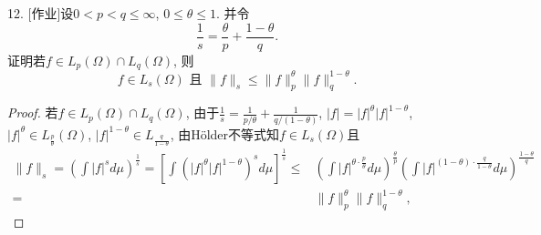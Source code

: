 \documentclass[a4paper,8pt]{ctexart}\textwidth 140mm \textheight 216mm
\newcommand{\8}{\infty}
\begin{document}
12. [作业]设$0<p<q\leq\infty$, $0\leq\theta\leq 1$. 并令
\[\frac{1}{s}=\frac{\theta}{p}+\frac{1-\theta}{q}.\]
证明若$f\in L_p(\Omega)\cap L_q(\Omega)$, 则
\[f\in L_s(\Omega)\mbox{ 且 }\|f\|_s\leq \|f\|_p^\theta\|f\|_q^{1-\theta}.\]
\begin{proof}
	若$f\in L_p(\Omega)\cap L_q(\Omega)$, 由于$\frac{1}{s}=\frac{1}{p/\theta}+\frac{1}{q/(1-\theta)}$, $|f|=|f|^{\theta}|f|^{1-\theta}$, $|f|^{\theta}\in L_{\frac{p}{\theta}}(\Omega)$, $|f|^{1-\theta}\in L_{\frac{q}{1-\theta}}$, 由H\"older不等式知$f\in L_{s}(\Omega)$且
	\[\begin{split}
	\|f\|_s=(\int |f|^sd\mu)^{\frac{1}{s}}=[\int (|f|^{\theta}|f|^{1-\theta})^s d\mu]^{\frac{1}{s}}\leq & (\int |f|^{\theta\cdot\frac{p}{\theta}}d\mu)^{\frac{\theta}{p}}(\int |f|^{(1-\theta)\cdot\frac{q}{1-\theta}}d\mu)^{\frac{1-\theta}{q}}\\
	= & \|f\|_p^{\theta}\|f\|_q^{1-\theta},
	\end{split}\]
\end{proof}
\end{document}
